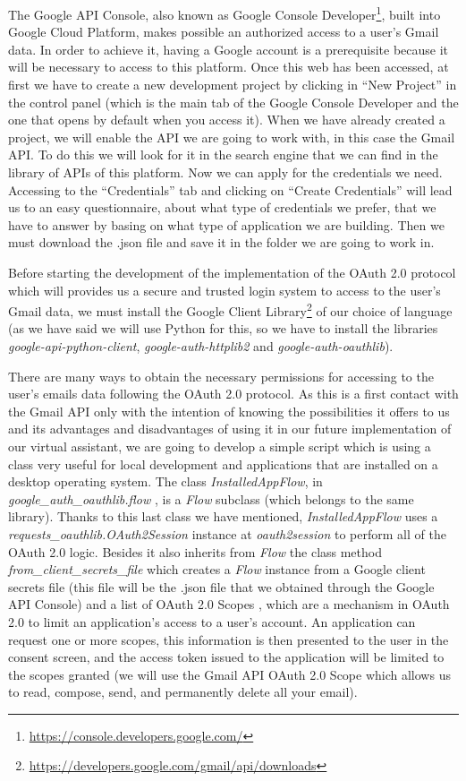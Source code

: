 The Google API Console, also known as Google Console Developer\footnote{\url{https://console.developers.google.com/}}, built into Google Cloud Platform, makes possible an authorized access to a user's Gmail data. In order to achieve it, having a Google account is a prerequisite because it will be necessary to access to this platform. Once this web has been accessed, at first we have to create a new development project by clicking in ``New Project'' in the control panel (which is the main tab of the Google Console Developer and the one that opens by default when you access it). When we have already created a project, we will enable the API we are going to work with, in this case the Gmail API. To do this we will look for it in the search engine that we can find in the library of APIs of this platform. Now we can apply for the credentials we need. Accessing to the ``Credentials'' tab and clicking on ``Create Credentials'' will lead us to an easy questionnaire, about what type of credentials we prefer, that we have to answer by basing on what type of application we are building. Then we must download the .json file and save it in the folder we are going to work in.

Before starting the development of the implementation of the OAuth 2.0 protocol which will provides us a secure and trusted login system to access to the user's Gmail data, we must install the Google Client Library\footnote{\url{https://developers.google.com/gmail/api/downloads}} of our choice of language (as we have said we will use Python for this, so we have to install the libraries \textit{google-api-python-client}, \textit{google-auth-httplib2} and \textit{google-auth-oauthlib}).

There are many ways to obtain the necessary permissions for accessing to the user's emails data following the OAuth 2.0 protocol. As this is a first contact with the Gmail API only with the intention of knowing the possibilities it offers to us and its advantages and disadvantages of using it in our future implementation of our virtual assistant, we are going to develop a simple script which is using a class very useful for local development and applications that are installed on a desktop operating system. The class \textit{InstalledAppFlow}, in \textit{google\_auth\_oauthlib.flow} \citep{oauthlib}, is a \textit{Flow} subclass (which belongs to the same library). Thanks to this last class we have mentioned, \textit{InstalledAppFlow} uses a \textit{requests\_oauthlib.OAuth2Session} instance at \textit{oauth2session} to perform all of the OAuth 2.0 logic. Besides it also inherits from \textit{Flow} the class method \textit{from\_client\_secrets\_file} which creates a \textit{Flow} instance from a Google client secrets file (this file will be the .json file that we obtained through the Google API Console) and a list of OAuth 2.0 Scopes \citep{oauth-scopes}, which are a mechanism  in OAuth 2.0 to limit an application's access to a user's account. An application can request one or more scopes, this information is then presented to the user in the consent screen, and the access token issued to the application will be limited to the scopes granted (we will use the Gmail API OAuth 2.0 Scope which allows us to read, compose, send, and permanently delete all your email).

